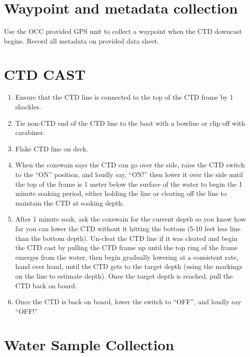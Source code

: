 \documentclass[]{book}
\providecommand{\tightlist}{%
  \setlength{\itemsep}{0pt}\setlength{\parskip}{0pt}}
\begin{document}
\hypertarget{waypoint-and-metadata-collection}{%
\section{Waypoint and metadata collection}\label{waypoint-and-metadata-collection}}

Use the OCC provided GPS unit to collect a waypoint when the CTD downcast begins. Record all metadata on provided data sheet.

\hypertarget{ctd-cast}{%
\section{CTD CAST}\label{ctd-cast}}

\begin{enumerate}
\def\labelenumi{\arabic{enumi}.}
\tightlist
\item
  Ensure that the CTD line is connected to the top of the CTD frame by 1 shackles.
\item
  Tie non-CTD end of the CTD line to the boat with a bowline or clip off with carabiner.
\item
  Flake CTD line on deck.
\item
  When the coxswain says the CTD can go over the side, raise the CTD switch to the ``ON'' position, and loudly say, ``ON!'' then lower it over the side until the top of the frame is 1 meter below the surface of the water to begin the 1 minute soaking period, either holding the line or cleating off the line to maintain the CTD at soaking depth.
\item
  After 1 minute soak, ask the coxswain for the current depth so you know how far you can lower the CTD without it hitting the bottom (5-10 feet less line than the bottom depth). Un-cleat the CTD line if it was cleated and begin the CTD cast by pulling the CTD frame up until the top ring of the frame emerges from the water, then begin gradually lowering at a consistent rate, hand over hand, until the CTD gets to the target depth (using the markings on the line to estimate depth). Once the target depth is reached, pull the CTD back on board.
\item
  Once the CTD is back on board, lower the switch to ``OFF'', and loudly say ``OFF!''
\end{enumerate}

\hypertarget{water-sample-collection}{%
\section{Water Sample Collection}\label{water-sample-collection}}
\end{document}
